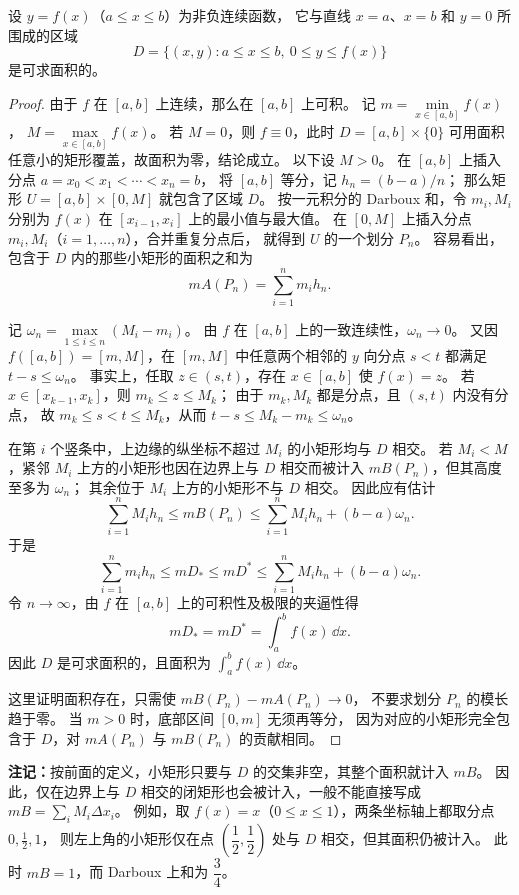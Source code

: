 \begin{example}
设 $y=f(x)$（$a\le x\le b$）为非负连续函数，
它与直线 $x=a$、$x=b$ 和 $y=0$ 所围成的区域
\[
D=\{(x,y):a\le x\le b,\ 0\le y\le f(x)\}
\]
是可求面积的。

\begin{center}

\end{center}

\begin{proof}
由于 $f$ 在 $[a,b]$ 上连续，那么在 $[a,b]$ 上可积。
记 $m=\min\limits_{x\in[a,b]}f(x)$，
$M=\max\limits_{x\in[a,b]}f(x)$。
若 $M=0$，则 $f\equiv0$，此时 $D=[a,b]\times\{0\}$
可用面积任意小的矩形覆盖，故面积为零，结论成立。
以下设 $M>0$。
在 $[a,b]$ 上插入分点
$a=x_0<x_1<\cdots<x_n=b$，
将 $[a,b]$ 等分，记 $h_n=(b-a)/n$；
那么矩形 $U=[a,b]\times[0,M]$ 就包含了区域 $D$。
按一元积分的 Darboux 和，令 $m_i,M_i$ 分别为
$f(x)$ 在 $[x_{i-1},x_i]$ 上的最小值与最大值。
在 $[0,M]$ 上插入分点
$m_i,M_i$（$i=1,\ldots,n$），合并重复分点后，
就得到 $U$ 的一个划分 $P_n$。
容易看出，包含于 $D$ 内的那些小矩形的面积之和为
\[
mA(P_n)=\sum_{i=1}^n m_i h_n.
\]

记 $\omega_n=\max\limits_{1\le i\le n}(M_i-m_i)$。
由 $f$ 在 $[a,b]$ 上的一致连续性，$\omega_n\to0$。
又因 $f([a,b])=[m,M]$，在 $[m,M]$ 中任意两个相邻的
$y$ 向分点 $s<t$ 都满足 $t-s\le\omega_n$。
事实上，任取 $z\in(s,t)$，存在 $x\in[a,b]$ 使 $f(x)=z$。
若 $x\in[x_{k-1},x_k]$，则 $m_k\le z\le M_k$；
由于 $m_k,M_k$ 都是分点，且 $(s,t)$ 内没有分点，
故 $m_k\le s<t\le M_k$，从而 $t-s\le M_k-m_k\le\omega_n$。

在第 $i$ 个竖条中，上边缘的纵坐标不超过 $M_i$ 的小矩形均与 $D$ 相交。
若 $M_i<M$，紧邻 $M_i$ 上方的小矩形也因在边界上与 $D$ 相交而被计入
$mB(P_n)$，但其高度至多为 $\omega_n$；
其余位于 $M_i$ 上方的小矩形不与 $D$ 相交。
因此应有估计
\[
\sum_{i=1}^n M_i h_n
\le mB(P_n)
\le\sum_{i=1}^n M_i h_n+(b-a)\omega_n.
\]
于是
\[
\sum_{i=1}^n m_i h_n
\le mD_*\le mD^*
\le\sum_{i=1}^n M_i h_n+(b-a)\omega_n.
\]
令 $n\to\infty$，由 $f$ 在 $[a,b]$ 上的可积性及极限的夹逼性得
\[
mD_*=mD^*=\int_a^b f(x)\,\dd x.
\]
因此 $D$ 是可求面积的，且面积为
$\displaystyle\int_a^b f(x)\,\dd x$。

这里证明面积存在，只需使 $mB(P_n)-mA(P_n)\to0$，
不要求划分 $P_n$ 的模长趋于零。
当 $m>0$ 时，底部区间 $[0,m]$ 无须再等分，
因为对应的小矩形完全包含于 $D$，对 $mA(P_n)$ 与 $mB(P_n)$ 的贡献相同。
\end{proof}

\textbf{注记：}按前面的定义，小矩形只要与 $D$ 的交集非空，其整个面积就计入 $mB$。
因此，仅在边界上与 $D$ 相交的闭矩形也会被计入，一般不能直接写成
$mB=\sum\limits_i M_i\Delta x_i$。
例如，取 $f(x)=x$（$0\le x\le1$），两条坐标轴上都取分点 $0,\frac12,1$，
则左上角的小矩形仅在点 $(\dfrac12,\dfrac12)$ 处与 $D$ 相交，但其面积仍被计入。
此时 $mB=1$，而 Darboux 上和为 $\dfrac34$。
\end{example}

